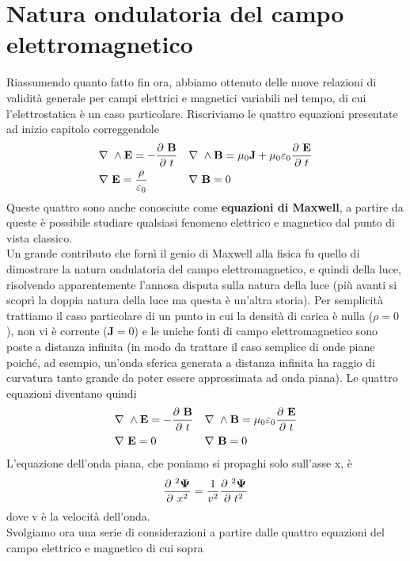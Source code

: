 \documentclass[
10pt, %
a4paper, %
oneside, %
headinclude,footinclude, %
BCOR5mm, %
]{scrartcl}
\begin{document}
\section{Natura ondulatoria del campo elettromagnetico}
Riassumendo quanto fatto fin ora, abbiamo ottenuto delle nuove relazioni di validità generale per campi elettrici e magnetici variabili nel tempo, di cui l'elettrostatica è un caso particolare. Riscriviamo le quattro equazioni presentate ad inizio capitolo correggendole
\begin{align*}
	&\nabla\ \wedge\mathbf{E}=-\frac{\partial\  \mathbf{B}}{\partial\  t}&&\nabla\ \wedge\mathbf{B}=\mu_0\mathbf{J}+\mu_0\varepsilon_0\frac{\partial\  \mathbf{E}}{\partial\  t}\\
	&\nabla\ \mathbf{E}=\frac{\rho}{\varepsilon_0}&&\nabla\ \mathbf{B}=0
\end{align*}
Queste quattro sono anche conosciute come \textbf{equazioni di Maxwell}, a partire da queste è possibile studiare qualsiasi fenomeno elettrico e magnetico dal punto di vista classico.\\
Un grande contributo che fornì il genio di Maxwell alla fisica fu quello di dimostrare la natura ondulatoria del campo elettromagnetico, e quindi della luce, risolvendo apparentemente l'annosa disputa sulla natura della luce (più avanti si scoprì la doppia natura della luce ma questa è un'altra storia). Per semplicità trattiamo il caso particolare di un punto in cui la densità di carica è nulla ($\rho = 0$), non vi è corrente (\(\mathbf{J}=0\)) e le uniche fonti di campo elettromagnetico sono poste a distanza infinita (in modo da trattare il caso semplice di onde piane poiché, ad esempio, un'onda sferica generata a distanza infinita ha raggio di curvatura tanto grande da poter essere approssimata ad onda piana). Le quattro equazioni diventano quindi
\begin{align*}
	&\nabla\ \wedge\mathbf{E}=-\frac{\partial\  \mathbf{B}}{\partial\  t}&&\nabla\ \wedge\mathbf{B}=\mu_0\varepsilon_0\frac{\partial\  \mathbf{E}}{\partial\  t}\\
	&\nabla\ \mathbf{E}=0&&\nabla\ \mathbf{B}=0
\end{align*}
 L'equazione dell'onda piana, che poniamo si propaghi solo sull'asse x, è
\[\frac{\partial\ ^2 \mathbf{\Psi}}{\partial\  x^2} = \frac{1}{v^2}\frac{\partial\ ^2 \mathbf{\Psi}}{\partial\  t^2}\]
dove v è la velocità dell'onda.\\
Svolgiamo ora una serie di considerazioni a partire dalle quattro equazioni del campo elettrico e magnetico di cui sopra 
\end{document}
